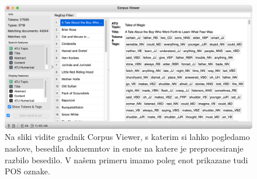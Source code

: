 \begin{figure}[h]
  \includegraphics[width=\linewidth]{corpus-viewer-pos.png}%
  \caption{Na sliki vidite gradnik Corpus Viewer, s katerim si lahko pogledamo naslove, besedila dokuemntov in enote na katere je preprocesiranje razbilo besedilo. V našem primeru imamo poleg enot prikazane tudi POS oznake.}
  \label{fig:002-corpus-viewer-pos}
\end{figure}
